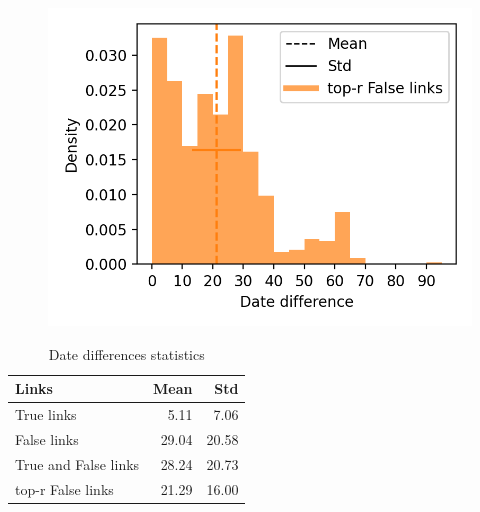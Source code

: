 \begin{figure}[!t]
  \label{fig:dates_differences_r_false}
  \includegraphics[width=\linewidth]{img/dates_differences_r_false.png}
\end{figure}

\begin{table}[!t]
  \centering
  \caption{Date differences statistics}
  \label{tab:date_differences}
    \begin{tabular}{l r r}
      \toprule
      Links                & Mean  & Std   \\
      \midrule
      True links           &  5.11 &  7.06 \\
      False links          & 29.04 & 20.58 \\
      True and False links & 28.24 & 20.73 \\
      top-r False links    & 21.29 & 16.00 \\
      \bottomrule
    \end{tabular}
\end{table}
